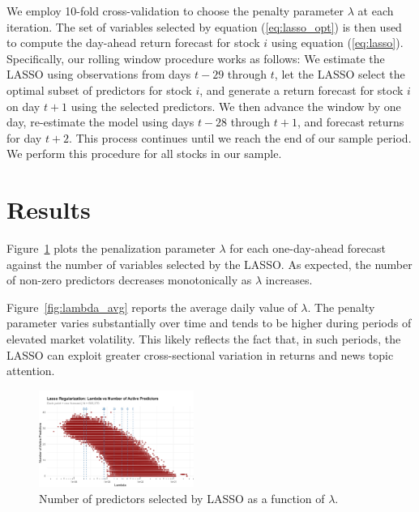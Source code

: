 \documentclass[10pt,twocolumn]{article}
\begin{document}
We employ 10-fold cross-validation to choose the penalty parameter $\lambda$ at each iteration. The set of variables selected by equation (\ref{eq:lasso_opt}) is then used to compute the day-ahead return forecast for stock $i$ using equation (\ref{eq:lasso}). \\ Specifically, our rolling window procedure works as follows: We estimate the LASSO using observations from days $t-29$ through $t$, let the LASSO select the optimal subset of predictors for stock $i$, and generate a return forecast for stock $i$ on day $t+1$ using the selected predictors. We then advance the window by one day, re-estimate the model using days $t-28$ through $t+1$, and forecast returns for day $t+2$. This process continues until we reach the end of our sample period. We perform this procedure for all stocks in our sample.

\section{Results}
\label{sec:results}

Figure~\ref{fig:var_selec} plots the penalization parameter $\lambda$ for each one-day-ahead 
forecast against the number of variables selected by the LASSO. As expected, the number of 
non-zero predictors decreases monotonically as $\lambda$ increases. 

Figure~\ref{fig:lambda_avg} reports the average daily value of $\lambda$. The penalty parameter 
varies substantially over time and tends to be higher during periods of elevated market volatility. 
This likely reflects the fact that, in such periods, the LASSO can exploit greater cross-sectional 
variation in returns and news topic attention.

\begin{figure}[h!] %
    \centering
    \includegraphics[width=0.45\textwidth]{lambdavspredictors.png} 
    \caption{Number of predictors selected by LASSO as a function of $\lambda$.}
    \label{fig:var_selec} %
\end{figure}
\end{document}
